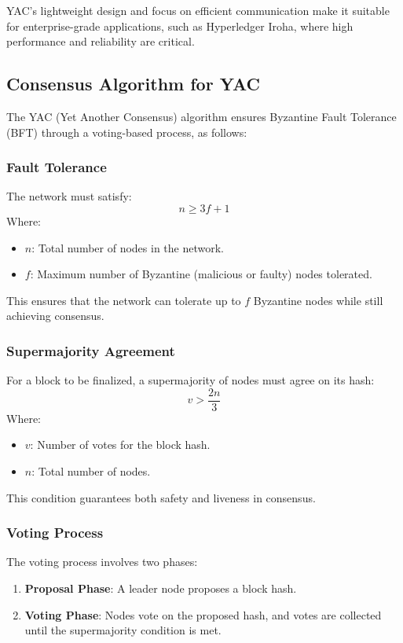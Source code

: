 \documentclass{article}
\begin{document}
YAC’s lightweight design and focus on efficient communication make it suitable for enterprise-grade applications, such as Hyperledger Iroha, where high performance and reliability are critical.

\subsection{Consensus Algorithm for YAC}

The YAC (Yet Another Consensus) algorithm ensures Byzantine Fault Tolerance (BFT) through a voting-based process, as follows:

\subsubsection{Fault Tolerance}

The network must satisfy:
\[
    n \geq 3f + 1
\]
Where:
\begin{itemize}
    \item \( n \): Total number of nodes in the network.
    \item \( f \): Maximum number of Byzantine (malicious or faulty) nodes tolerated.
\end{itemize}

This ensures that the network can tolerate up to \( f \) Byzantine nodes while still achieving consensus.

\subsubsection{Supermajority Agreement}
For a block to be finalized, a supermajority of nodes must agree on its hash:
\[
    v > \frac{2n}{3}
\]
Where:
\begin{itemize}
    \item \( v \): Number of votes for the block hash.
    \item \( n \): Total number of nodes.
\end{itemize}

This condition guarantees both safety and liveness in consensus.

\subsubsection{Voting Process}

The voting process involves two phases:
\begin{enumerate}
    \item \textbf{Proposal Phase}: A leader node proposes a block hash.
    \item \textbf{Voting Phase}: Nodes vote on the proposed hash, and votes are collected until the supermajority condition is met.
\end{enumerate}
\end{document}
